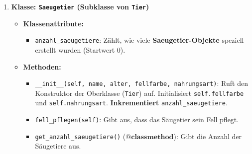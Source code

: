 \begin{enumerate}
    \item \textbf{Klasse: \texttt{Saeugetier} (Subklasse von \texttt{Tier})}
    \begin{itemize}
        \item \textbf{Klassenattribute:}
        \begin{itemize}
            \item \texttt{anzahl\_saeugetiere}: Zählt, wie viele \textbf{Saeugetier-Objekte} speziell erstellt wurden (Startwert 0).
        \end{itemize}
        \item \textbf{Methoden:}
        \begin{itemize}
            \item \texttt{\_\_init\_\_(self, name, alter, fellfarbe, nahrungsart)}: Ruft den Konstruktor der Oberklasse (\texttt{Tier}) auf. Initialisiert \texttt{self.fellfarbe} und \texttt{self.nahrungsart}. \textbf{Inkrementiert} \texttt{anzahl\_saeugetiere}.
            \item \texttt{fell\_pflegen(self)}: Gibt aus, dass das Säugetier sein Fell pflegt.
            \item \texttt{get\_anzahl\_saeugetiere()} ($\mathbf{@classmethod}$): Gibt die Anzahl der Säugetiere aus.
        \end{itemize}
    \end{itemize}
\end{enumerate}